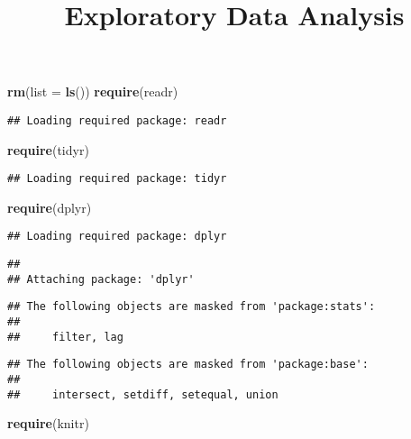 \documentclass[
]{article}
\title{Exploratory Data Analysis}
\author{}
\date{\vspace{-2.5em}}
\newenvironment{Shaded}{\begin{snugshade}}{\end{snugshade}}
\newcommand{\AttributeTok}[1]{\textcolor[rgb]{0.13,0.29,0.53}{#1}}
\newcommand{\FunctionTok}[1]{\textcolor[rgb]{0.13,0.29,0.53}{\textbf{#1}}}
\newcommand{\NormalTok}[1]{#1}
\begin{document}
\maketitle

\begin{Shaded}
\begin{Highlighting}[]
\FunctionTok{rm}\NormalTok{(}\AttributeTok{list =} \FunctionTok{ls}\NormalTok{())}
\FunctionTok{require}\NormalTok{(readr)}
\end{Highlighting}
\end{Shaded}

\begin{verbatim}
## Loading required package: readr
\end{verbatim}

\begin{Shaded}
\begin{Highlighting}[]
\FunctionTok{require}\NormalTok{(tidyr)}
\end{Highlighting}
\end{Shaded}

\begin{verbatim}
## Loading required package: tidyr
\end{verbatim}

\begin{Shaded}
\begin{Highlighting}[]
\FunctionTok{require}\NormalTok{(dplyr)}
\end{Highlighting}
\end{Shaded}

\begin{verbatim}
## Loading required package: dplyr
\end{verbatim}

\begin{verbatim}
## 
## Attaching package: 'dplyr'
\end{verbatim}

\begin{verbatim}
## The following objects are masked from 'package:stats':
## 
##     filter, lag
\end{verbatim}

\begin{verbatim}
## The following objects are masked from 'package:base':
## 
##     intersect, setdiff, setequal, union
\end{verbatim}

\begin{Shaded}
\begin{Highlighting}[]
\FunctionTok{require}\NormalTok{(knitr)}
\end{Highlighting}
\end{Shaded}
\end{document}
